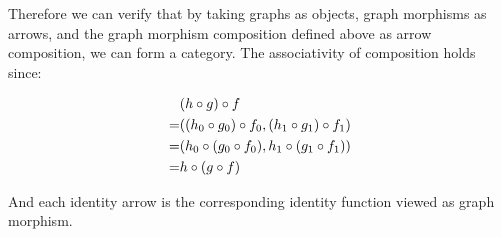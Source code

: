 \documentclass[11pt]{article}
\begin{document}
Therefore we can verify that by taking graphs as objects, graph morphisms as arrows,
and the graph morphism composition defined above as arrow composition, we can form a category.
The associativity of composition holds since:

\begin{align*}
  & (h \circ g) \circ f \\
  = & ((h_0 \circ g_0) \circ f_0, (h_1 \circ g_1) \circ f_1) \\
  = & (h_0 \circ (g_0 \circ f_0), h_1 \circ (g_1 \circ f_1)) \\
  = & h \circ (g \circ f)
\end{align*}

And each identity arrow is the corresponding identity function viewed as graph morphism.
\end{document}
